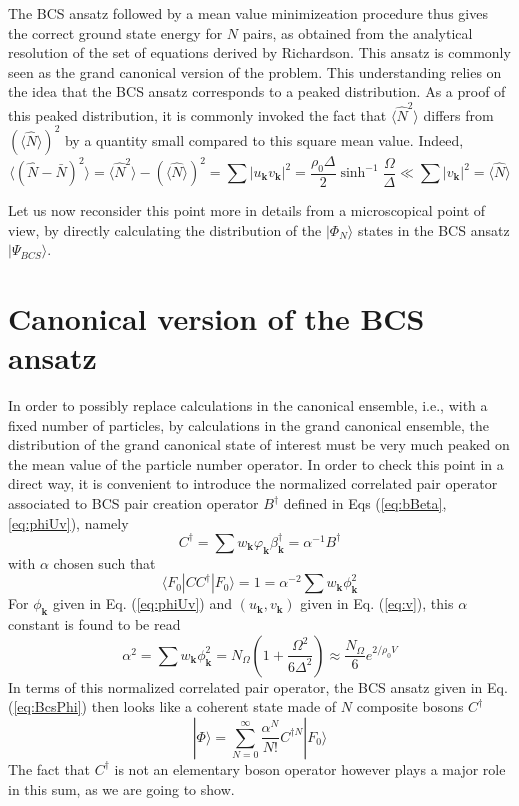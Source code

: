 \documentclass[aps,prb,preprint,groupedaddress,amsmath]{revtex4-1}
\newcommand{\vk}{\ensuremath{\mathbf{k}}}
\newcommand{\dg}{\ensuremath{\dagger}}
\begin{document}
The BCS  ansatz followed by a mean value minimizeation procedure thus  gives the correct ground state energy for $N$ pairs, as obtained from the analytical resolution of the set of equations derived by Richardson. This ansatz is commonly seen as the grand canonical version of the problem. This understanding relies on the idea that the BCS ansatz corresponds to a peaked distribution. As a proof of this peaked distribution, it is commonly invoked the fact that $\langle\hat{N}^2\rangle$ differs from $(\langle\hat{N}\rangle)^2$ by a quantity small compared to this square mean value.  Indeed, 
\begin{equation}
 \langle(\hat{N}-\bar{N})^2\rangle=\langle\hat{N}^2\rangle-(\langle\hat{N}\rangle)^2=\sum{}|u_\vk{}v_\vk|^2=\frac{\rho_0\Delta}2\sinh^{-1}{\frac{\Omega}{\Delta}}\ll\sum{}|v_\vk|^2=\langle\hat{N}\rangle
\end{equation}


Let us now reconsider this point more in details from a microscopical point of view, by directly calculating the distribution of the $|\Phi_N\rangle$ states in the BCS ansatz $|\Psi_{BCS}\rangle$.  

\section{Canonical version of the BCS ansatz}
In order to possibly replace calculations in the  canonical ensemble, i.e., with a fixed number of particles, by calculations in the grand canonical ensemble, the  distribution of the grand canonical state of interest  must be very much peaked on the mean value of the particle number operator.  In order to check this point in a direct way, it is convenient to introduce the normalized correlated pair operator associated to BCS pair creation operator $B^\dg$ defined in Eqs (\ref{eq:bBeta},\ref{eq:phiUv}), namely
\begin{equation}\label{eq:c}
{C}^\dg=\sum{w_\vk}{\varphi}_\vk\beta^\dg_\vk=\alpha^{-1}B^\dg
\end{equation} 
with $\alpha$ chosen such that 
\begin{equation}
\langle{}F_0|CC^\dg|F_0\rangle=1=\alpha^{-2}\sum{w_\vk}\phi_\vk^2
\end{equation}
For $\phi_\vk$ given in Eq. (\ref{eq:phiUv}) and $(u_\vk,v_\vk)$ given in Eq. (\ref{eq:v}), this $\alpha$ constant is found to be read
\begin{equation}\label{eq:alpha}
\alpha^{2}=\sum{w_\vk}\phi_\vk^2=N_\Omega\left(1+\frac{\Omega^2}{6\Delta^2}\right)\approx\frac{N_\Omega}6e^{2/\rho_0V}
\end{equation}
In terms of this normalized correlated pair operator, the BCS ansatz given in Eq. (\ref{eq:BcsPhi}) then looks like a coherent state made of $N$ composite bosons $C^\dg$
\begin{equation}
|\Phi{\rangle}=\sum^\infty_{N=0}\frac{\alpha^N}{N!}C^{\dg{}N}|F_0{\rangle}
\label{eq:BcsPhiNorl}
\end{equation}
The fact that $C^\dg$ is not an elementary boson operator however plays a major role in this sum, as we are going to show.
\end{document}
